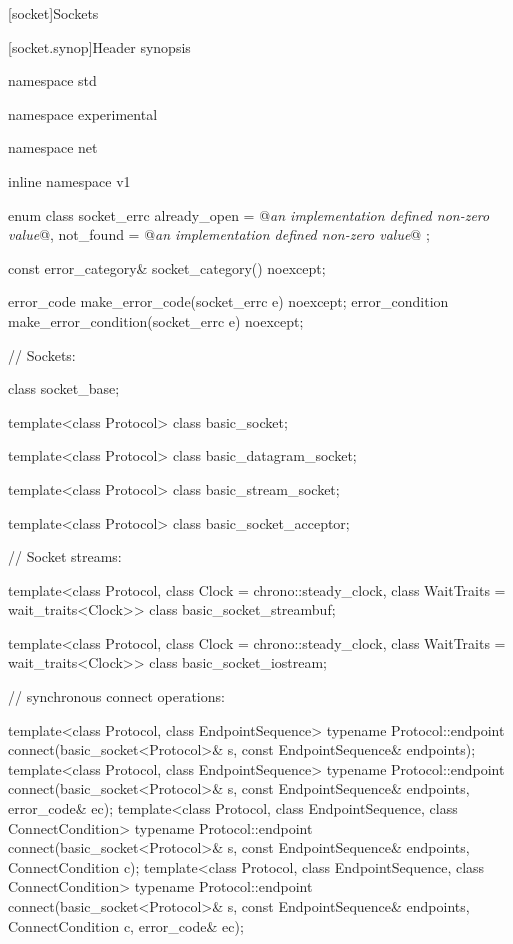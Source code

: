 
[socket]{Sockets}


[socket.synop]{Header  synopsis}

\begin{codeblock}
namespace std {
namespace experimental {
namespace net {
inline namespace v1 {

  enum class socket_errc {
    already_open = @\textit{an implementation defined non-zero value}@,
    not_found = @\textit{an implementation defined non-zero value}@
  };

  const error_category& socket_category() noexcept;

  error_code make_error_code(socket_errc e) noexcept;
  error_condition make_error_condition(socket_errc e) noexcept;

  // Sockets:

  class socket_base;

  template<class Protocol>
    class basic_socket;

  template<class Protocol>
    class basic_datagram_socket;

  template<class Protocol>
    class basic_stream_socket;

  template<class Protocol>
    class basic_socket_acceptor;

  // Socket streams:

  template<class Protocol, class Clock = chrono::steady_clock,
    class WaitTraits = wait_traits<Clock>>
      class basic_socket_streambuf;

  template<class Protocol, class Clock = chrono::steady_clock,
    class WaitTraits = wait_traits<Clock>>
      class basic_socket_iostream;

  // synchronous connect operations:

  template<class Protocol, class EndpointSequence>
    typename Protocol::endpoint connect(basic_socket<Protocol>& s,
                                        const EndpointSequence& endpoints);
  template<class Protocol, class EndpointSequence>
    typename Protocol::endpoint connect(basic_socket<Protocol>& s,
                                        const EndpointSequence& endpoints,
                                        error_code& ec);
  template<class Protocol, class EndpointSequence, class ConnectCondition>
    typename Protocol::endpoint connect(basic_socket<Protocol>& s,
                                        const EndpointSequence& endpoints,
                                        ConnectCondition c);
  template<class Protocol, class EndpointSequence, class ConnectCondition>
    typename Protocol::endpoint connect(basic_socket<Protocol>& s,
                                        const EndpointSequence& endpoints,
                                        ConnectCondition c,
                                        error_code& ec);

}}}}
\end{codeblock}

